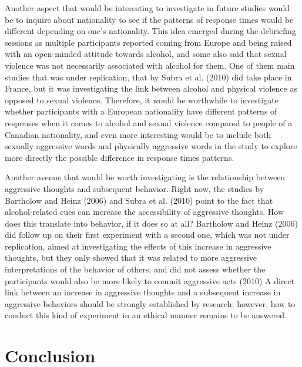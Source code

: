 \documentclass[authordate, serif, review]{jote-article}
\begin{document}
\begin{multicols}{2}
 Another aspect that would be interesting to investigate in future studies would be to inquire about nationality to see if the patterns of response times would be different depending on one's nationality. This idea emerged during the debriefing sessions as multiple participants reported coming from Europe and being raised with an open-minded attitude towards alcohol, and some also said that sexual violence was not necessarily associated with alcohol for them. One of them main studies that was under replication, that by Subra et al. (2010) did take place in France, but it was investigating the link between alcohol and physical violence as opposed to sexual violence. Therefore, it would be worthwhile to investigate whether participants with a European nationality have different patterns of responses when it comes to alcohol and sexual violence compared to people of a Canadian nationality, and even more interesting would be to include both sexually aggressive words and physically aggressive words in the study to explore more directly the possible difference in response times patterns.  

Another avenue that would be worth investigating is the relationship between aggressive thoughts and subsequent behavior. Right now, the studies by Bartholow and Heinz (2006) and Subra et al. (2010) point to the fact that alcohol-related cues can increase the accessibility of aggressive thoughts. How does this translate into behavior, if it does so at all? Bartholow and Heinz (2006) did follow up on their first experiment with a second one, which was not under replication, aimed at investigating the effects of this increase in aggressive thoughts, but they only showed that it was related to more aggressive interpretations of the behavior of others, and did not assess whether the participants would also be more likely to commit aggressive acts (2010)  A direct link between an increase in aggressive thoughts and a subsequent increase in aggressive behaviors should be strongly established by research; however, how to conduct this kind of experiment in an ethical manner remains to be answered. 

{}
\section*{Conclusion} \gotoreview
\label{sec:conclusion}


\end{multicols}
\end{document}
